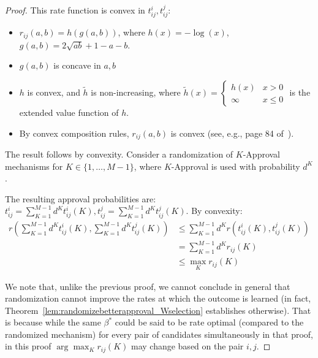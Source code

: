 \documentclass[10pt]{article}
\begin{document}
\begin{ReviewVerbatim}
\begin{proof}
	This rate function is convex in $t^i_{ij}, t^j_{ij}$:
	\begin{itemize}
		\item $r_{ij}(a,b) = h(g(a, b))$, where $h(x) = -\log(x)$, $g(a, b) = 2\sqrt{ab} + 1 - a - b$.
		\item $g(a, b)$ is concave in $a, b$
		\item $h$ is convex, and $\tilde{h}$ is non-increasing, where $\tilde{h}(x) =  \begin{cases} h(x) & x > 0 \\ \infty & x \leq 0 \end{cases}$ is the extended value function of $h$.
		\item By convex composition rules, $r_{ij}(a,b)$ is convex (see, e.g., page 84 of~\citet{boyd_convex_2004}).
	\end{itemize}

	The result follows by convexity. Consider a randomization of $K$-Approval mechanisms for $K\in\{1, \dots, M-1\}$, where $K$-Approval is used with probability $d^K$.

%

	The resulting approval probabilities are: $t^i_{ij} = \sum_{K=1}^{M-1} d^K t^i_{ij}(K), t^j_{ij} = \sum_{K=1}^{M-1} d^K t^j_{ij}(K)$. By convexity:
	\begin{align*}
	r\left(\sum_{K=1}^{M-1} d^K t^i_{ij}(K), \sum_{K=1}^{M-1} d^K t^j_{ij}(K)\right) &\leq \sum_{K=1}^{M-1} d^K r\left(t^i_{ij}(K), t^j_{ij}(K)\right)\\
	&= \sum_{K=1}^{M-1} d^K  r_{ij}(K)\\
	&\leq \max_K r_{ij}(K)
	\end{align*}

We note that, unlike the previous proof, we cannot conclude in general that randomization cannot improve the rates at which the outcome is learned (in fact, Theorem~\ref{lem:randomizebetterapproval_Wselection} establishes otherwise). That is because while the same $\beta^*$ could be said to be rate optimal (compared to the randomized mechanism) for every pair of candidates simultaneously in that proof, in this proof $\arg\max_K r_{ij}(K)$ may change based on the pair $i,j$.

\end{proof}
\end{ReviewVerbatim}
\end{document}

